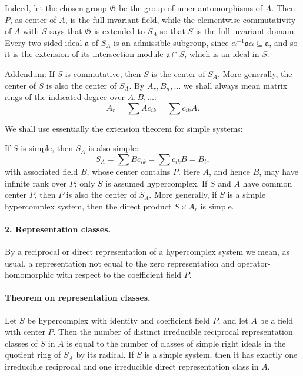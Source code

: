 \documentclass[11pt]{article}
\providecommand{\frG}{\mathfrak G}
\begin{document}
Indeed, let the chosen group \(\frG\) be the group of inner automorphisms of \(A\). Then \(P\), as center of \(A\), is the full invariant field, while the elementwise commutativity of \(A\) with \(S\) says that \(\frG\) is extended to \(S_A\) so that \(S\) is the full invariant domain. Every two-sided ideal \(\mathfrak a\) of \(S_A\) is an admissible subgroup, since \(\alpha^{-1}\mathfrak a\alpha\subseteq \mathfrak a\), and so it is the extension of its intersection module \(\mathfrak a\cap S\), which is an ideal in \(S\).

Addendum: If \(S\) is commutative, then \(S\) is the center of \(S_A\). More generally, the center of \(S\) is also the center of \(S_A\). By \(A_r,B_n,\ldots\) we shall always mean matrix rings of the indicated degree over \(A,B,\ldots\):
\[
        A_r=\sum A c_{ik}=\sum c_{ik}A.
\]

We shall use essentially the extension theorem for simple systems:

If \(S\) is simple, then \(S_A\) is also simple:
\[
        S_A=\sum Bc_{ik}=\sum c_{ik}B=B_t,
\]
with associated field \(B\), whose center contains \(P\). Here \(A\), and hence \(B\), may have infinite rank over \(P\); only \(S\) is assumed hypercomplex. If \(S\) and \(A\) have common center \(P\), then \(P\) is also the center of \(S_A\). More generally, if \(S\) is a simple hypercomplex system, then the direct product \(S\times A_r\) is simple.

\paragraph{2. Representation classes.}
By a reciprocal or direct representation of a hypercomplex system we mean, as usual, a representation not equal to the zero representation and operator-homomorphic with respect to the coefficient field \(P\).

\paragraph{Theorem on representation classes.}
Let \(S\) be hypercomplex with identity and coefficient field \(P\), and let \(A\) be a field with center \(P\). Then the number of distinct irreducible reciprocal representation classes of \(S\) in \(A\) is equal to the number of classes of simple right ideals in the quotient ring of \(S_A\) by its radical. If \(S\) is a simple system, then it has exactly one irreducible reciprocal and one irreducible direct representation class in \(A\).
\end{document}
